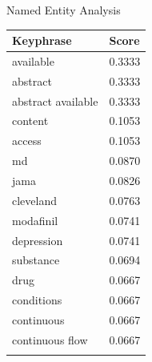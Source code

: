 \documentclass[
  ignorenonframetext,
]{beamer}
\newcounter{none} %
\begin{document}
\begin{frame}[allowframebreaks]{Named Entity Analysis}
{\def\LTcaptype{none} %
\begin{longtable}[]{@{}ll@{}}
\toprule\noalign{}
Keyphrase & Score \\
\midrule\noalign{}
\endhead
available & 0.3333 \\
abstract & 0.3333 \\
abstract available & 0.3333 \\
content & 0.1053 \\
access & 0.1053 \\
md & 0.0870 \\
jama & 0.0826 \\
cleveland & 0.0763 \\
modafinil & 0.0741 \\
depression & 0.0741 \\
substance & 0.0694 \\
drug & 0.0667 \\
conditions & 0.0667 \\
continuous & 0.0667 \\
continuous flow & 0.0667 \\
\bottomrule\noalign{}
\end{longtable}
}
\end{frame}
\end{document}
